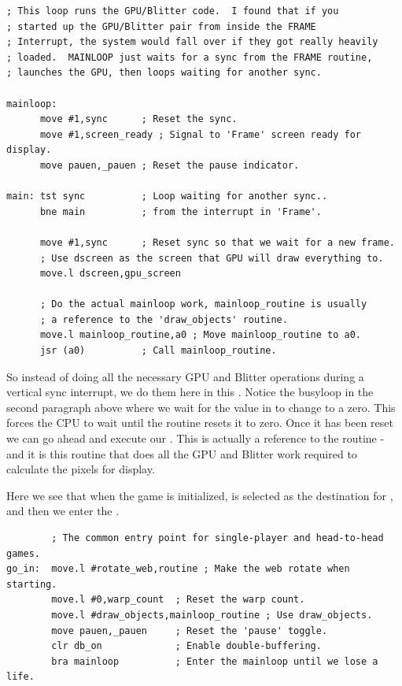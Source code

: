\begin{lstlisting}[escapechar=\%]
; This loop runs the GPU/Blitter code.  I found that if you
; started up the GPU/Blitter pair from inside the FRAME
; Interrupt, the system would fall over if they got really heavily
; loaded.  MAINLOOP just waits for a sync from the FRAME routine,
; launches the GPU, then loops waiting for another sync.

mainloop:
      move #1,sync      ; Reset the sync.
      move #1,screen_ready ; Signal to 'Frame' screen ready for display.
      move pauen,_pauen ; Reset the pause indicator.
  
main: tst sync          ; Loop waiting for another sync..
      bne main          ; from the interrupt in 'Frame'.
  
      move #1,sync      ; Reset sync so that we wait for a new frame.
      ; Use dscreen as the screen that GPU will draw everything to.
      move.l dscreen,gpu_screen  
  
      ; Do the actual mainloop work, mainloop_routine is usually 
      ; a reference to the 'draw_objects' routine.
      move.l mainloop_routine,a0 ; Move mainloop_routine to a0. 
      jsr (a0)          ; Call mainloop_routine. 
\end{lstlisting}

So instead of doing all the necessary GPU and Blitter operations during a vertical sync interrupt, we do them
here in this . Notice the busyloop in the second paragraph above where we wait for the value in 
to change to a zero. This forces the CPU to wait until the  routine resets it to zero. Once it has
been reset we can go ahead and execute our . This is actually a reference to the 
 routine - and it is this routine that does all the GPU and Blitter work required to calculate
the pixels for display.

Here we see that when the game is initialized,  is selected as the destination for
, and then we enter the .
\begin{lstlisting}
        ; The common entry point for single-player and head-to-head games.
go_in:  move.l #rotate_web,routine ; Make the web rotate when starting.
        move.l #0,warp_count  ; Reset the warp count.
        move.l #draw_objects,mainloop_routine ; Use draw_objects.
        move pauen,_pauen     ; Reset the 'pause' toggle.
        clr db_on             ; Enable double-buffering.
        bra mainloop          ; Enter the mainloop until we lose a life.
\end{lstlisting}

